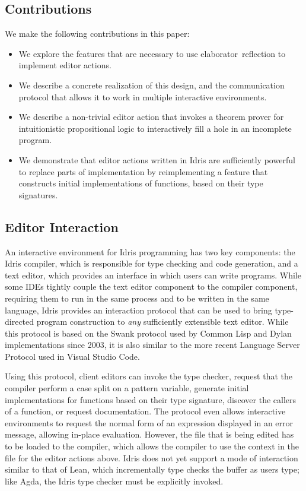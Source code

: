 \subsection*{Contributions}

We make the following contributions in this paper:

\begin{itemize}[leftmargin=10pt]
\item We explore the features that are necessary to use
  \mbox{elaborator reflection} to implement editor actions.
\item We describe a concrete realization of this design, and the
  communication protocol that allows it to work in multiple
  interactive environments.
\item We describe a non-trivial editor action that invokes a
  theorem prover for intuitionistic propositional logic to
  interactively fill a hole in an incomplete
  program.
\item We demonstrate that editor actions written in Idris are
  sufficiently powerful to replace parts of implementation by
  reimplementing a feature that constructs initial implementations of
  functions, based on their type signatures.
\end{itemize}

\newpage
\subsection{Editor Interaction}

An interactive environment for Idris programming has two key
components: the Idris compiler, which is responsible for type checking
and code generation, and a text editor, which provides an interface in
which users can write programs. While some IDEs tightly couple the
text editor component to the compiler component, requiring them to run
in the same process and to be written in the same language, Idris
provides an interaction protocol that can be used to bring
type-directed program construction to \emph{any} sufficiently
extensible text editor. While this protocol is based on the Swank
protocol used by Common Lisp and Dylan implementations since 2003, it
is also similar to the more recent Language Server Protocol
used in Visual Studio Code.

Using this protocol, client editors can invoke the type checker,
request that the compiler perform a case split on a pattern variable,
generate initial implementations for functions based on their type
signature, discover the callers of a function, or request
documentation. The protocol even allows interactive environments to
request the normal form of an expression displayed in an error
message, allowing in-place evaluation. However, the file that is being
edited has to be loaded to the compiler, which allows the compiler to
use the context in the file for the editor actions above. Idris does
not yet support a mode of interaction similar to that of Lean, which
incrementally type checks the buffer as users type; like Agda, the
Idris type checker must be explicitly invoked.

